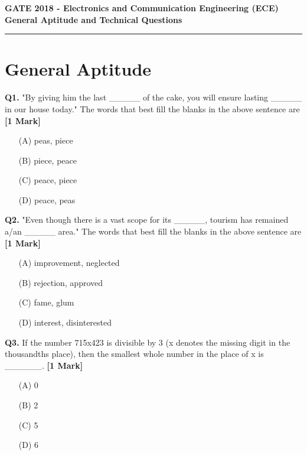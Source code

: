 \documentclass[11pt]{article}
\newcommand{\questiona}[2]{
    \noindent\textbf{Q#2.} #1 \hfill \textbf{[1 Mark]}
}
\begin{document}
\begin{center}
    \Large\textbf{GATE 2018 - Electronics and Communication Engineering (ECE)} \\
    \large\textbf{General Aptitude and Technical Questions} \\
    \rule{\textwidth}{0.5pt} %
\end{center}

\vspace{0.5cm}

\section*{General Aptitude}

\questiona{"By giving him the last \_\_\_\_\_ of the cake, you will ensure lasting \_\_\_\_\_ in our house today." The words that best fill the blanks in the above sentence are}{1}
\begin{enumerate}
    \item[(A)] peas, piece
    \item[(B)] piece, peace  
    \item[(C)] peace, piece
    \item[(D)] peace, peas
\end{enumerate}

\vspace{0.5cm}

\questiona{"Even though there is a vast scope for its \_\_\_\_\_, tourism has remained a/an \_\_\_\_\_ area." The words that best fill the blanks in the above sentence are}{2}
\begin{enumerate}
    \item[(A)] improvement, neglected  
    \item[(B)] rejection, approved  
    \item[(C)] fame, glum  
    \item[(D)] interest, disinterested
\end{enumerate}

\vspace{0.5cm}

\questiona{If the number 715x423 is divisible by 3 (x denotes the missing digit in the thousandths place), then the smallest whole number in the place of x is \_\_\_\_\_\_.}{3}
\begin{enumerate}
    \item[(A)] 0
    \item[(B)] 2
    \item[(C)] 5
    \item[(D)] 6
\end{enumerate}
\end{document}
